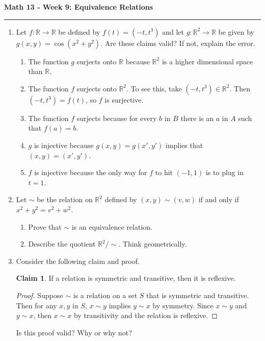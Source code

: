 \documentclass[12pt]{report}
\theoremstyle{definition}
\newtheorem{claim}{Claim}
\newcommand{\reals}{\mathbb{R}}
\begin{document}
\begin{center}
{\bf \Large Math 13 - Week 9: Equivalence Relations}
\vspace{0.2cm}
\hrule
\end{center}

\begin{enumerate}

\item Let $f: \reals\to \reals$ be defined by $f(t) = (-t, t^3)$ and let $g: \reals^2\to \reals$ be given by $g(x,y) = \cos(x^2+y^2)$.
Are these claims valid? If not, explain the error.
\begin{enumerate}
	\item The function $g$ surjects onto $\reals$ because $\reals^2$ is a higher dimensional space than $\reals$.

	\vfill

	\item The function $f$ surjects onto $\reals^2$. To see this, take $(-t, t^3)\in \reals^2$. Then $(-t, t^3) = f(t)$, so $f$ is surjective.

	\vfill

	\item The function $f$ surjects because for every $b$ in $B$ there is an $a$ in $A$ such that $f(a) = b$.

	\vfill

	\item $g$ is injective because $g(x,y) = g(x',y')$ implies that $(x,y) = (x',y')$.

	\vfill

	\item $f$ is injective because the only way for $f$ to hit $(-1, 1)$ is to plug in $t=1$.
	\vfill
\end{enumerate}

\item Let $\sim$ be the relation on $\reals^2$ defined by $(x,y)\sim (v,w)$ if and only if $x^2+y^2 = v^2+w^2$.
\begin{enumerate}
	\item Prove that $\sim$ is an equivalence relation.

	\vfill

	\item Describe the quotient $\reals^2 / \sim$. Think geometrically.
\end{enumerate}

\vfill

\item Consider the following claim and proof.
\begin{claim}
	If a relation is symmetric and transitive, then it is reflexive.
\end{claim}
\begin{proof}
	Suppose $\sim$ is a relation on a set $S$ that is symmetric and transitive.
	Then for any $x,y$ in $S$, $x\sim y$ implies $y\sim x$ by symmetry.
	Since $x\sim y$ and $y\sim x$, then $x\sim x$ by transitivity and the relation is reflexive.
\end{proof}
Is this proof valid? Why or why not?

\vfill
\end{enumerate}
\end{document}
